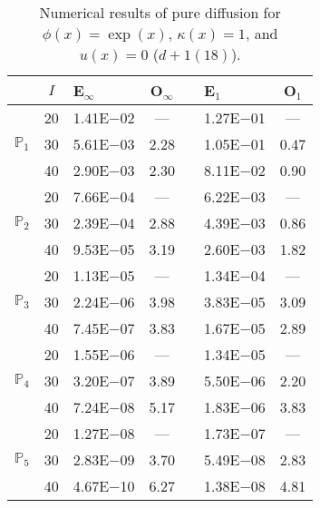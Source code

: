 \begin{table}[H]
\centering
\caption{Numerical results of pure diffusion for $\phi(x)=\exp(x)$, $\kappa(x)=1$, and $u(x)=0$ ($d+1 (18)$).}
\begin{tabular}{@{}l c l c c l c@{}}
\toprule
 & $I$ & E$_{\infty}$ & O$_{\infty}$ && E$_1$ & O$_1$\\
\midrule
\multirow{3}{*}{$\mathbb{P}_{1}$}
 & 20 & 1.41E$-$02 & --- && 1.27E$-$01 & ---\\
 & 30 & 5.61E$-$03 & 2.28 && 1.05E$-$01 & 0.47\\
 & 40 & 2.90E$-$03 & 2.30 && 8.11E$-$02 & 0.90\\
\midrule
\multirow{3}{*}{$\mathbb{P}_{2}$}
 & 20 & 7.66E$-$04 & --- && 6.22E$-$03 & ---\\
 & 30 & 2.39E$-$04 & 2.88 && 4.39E$-$03 & 0.86\\
 & 40 & 9.53E$-$05 & 3.19 && 2.60E$-$03 & 1.82\\
\midrule
\multirow{3}{*}{$\mathbb{P}_{3}$}
 & 20 & 1.13E$-$05 & --- && 1.34E$-$04 & ---\\
 & 30 & 2.24E$-$06 & 3.98 && 3.83E$-$05 & 3.09\\
 & 40 & 7.45E$-$07 & 3.83 && 1.67E$-$05 & 2.89\\
\midrule
\multirow{3}{*}{$\mathbb{P}_{4}$}
 & 20 & 1.55E$-$06 & --- && 1.34E$-$05 & ---\\
 & 30 & 3.20E$-$07 & 3.89 && 5.50E$-$06 & 2.20\\
 & 40 & 7.24E$-$08 & 5.17 && 1.83E$-$06 & 3.83\\
\midrule
\multirow{3}{*}{$\mathbb{P}_{5}$}
 & 20 & 1.27E$-$08 & --- && 1.73E$-$07 & ---\\
 & 30 & 2.83E$-$09 & 3.70 && 5.49E$-$08 & 2.83\\
 & 40 & 4.67E$-$10 & 6.27 && 1.38E$-$08 & 4.81\\
\bottomrule
\end{tabular}
\end{table}